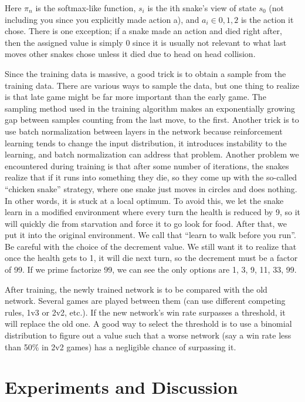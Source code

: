﻿\documentclass{article}
\begin{document}
Here $\pi_n$ is the softmax-like function, $s_i$ is the ith snake’s view of
state $s_0$ (not including you since you explicitly made action a), and $a_i
  \in {0,1,2}$ is the action it chose. There is one exception; if a snake made
an action and died right after, then the assigned value is simply 0 since it
is usually not relevant to what last moves other snakes chose unless it died
due to head on head collision.

Since the training data is massive, a good trick is to obtain a sample from the
training data. There are various ways to sample the data, but one thing to
realize is that late game might be far more important than the early game. The
sampling method used in the training algorithm makes an exponentially growing
gap between samples counting from the last move, to the first. Another trick
is to use batch normalization between layers in the network because
reinforcement learning tends to change the input distribution, it introduces
instability to the learning, and batch normalization can address that problem.
Another problem we encountered during training is that after some number of
iterations, the snakes realize that if it runs into something they die, so they
come up with the so-called “chicken snake” strategy, where one snake just
moves in circles and does nothing. In other words, it is stuck at a local optimum.
To avoid this, we let the snake learn in a modified environment where every turn
the health is reduced by 9, so it will quickly die from starvation and force it
to go look for food. After that, we put it into the original environment. We
call that “learn to walk before you run”. Be careful with the choice of the
decrement value. We still want it to realize that once the health gets to 1, it
will die next turn, so the decrement must be a factor of 99. If we prime
factorize 99, we can see the only options are 1, 3, 9, 11, 33, 99.

After training, the newly trained network is to be compared with the old network.
Several games are played between them (can use different competing rules,
1v3 or 2v2, etc.). If the new network’s win rate surpasses a threshold, it will
replace the old one. A good way to select the threshold is to use a binomial
distribution to figure out a value such that a worse network (say a win rate
less than 50\% in 2v2 games) has a negligible chance of surpassing it.


\section{Experiments and Discussion}
\end{document}
